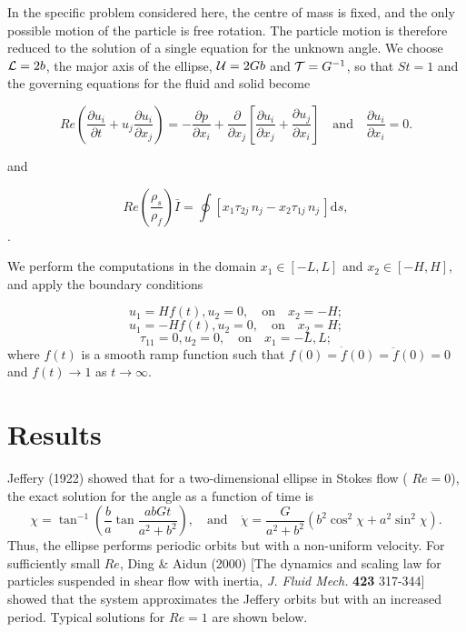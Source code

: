 In the specific problem considered here, the centre of mass is fixed, and the only possible motion of the particle is free rotation. The particle motion is therefore reduced to the solution of a single equation for the unknown angle. We choose $ {\cal L} = 2b $, the major axis of the ellipse, $ {\cal U} = 2Gb $ and $ {\cal T} = G^{-1} $, so that $ St = 1 $ and the governing equations for the fluid and solid become \begin{center} \[ Re \left (\frac{\partial u_i}{\partial t} + u_j \frac{\partial u_i}{\partial x_j} \right) = - \frac{\partial p}{\partial x_i} + \frac{\partial }{\partial x_j} \left[ \frac{\partial u_i}{\partial x_j} + \frac{\partial u_j}{\partial x_i} \right] \quad\mbox{and}\quad \frac{\partial u_i}{\partial x_i} = 0. \] \end{center}  and \begin{center} \[ Re \left(\frac{\rho_{s}}{\rho_{f}}\right) \bar{I} = \oint \left[x_{1}\tau_{2j}\,n_{j} - x_{2} \tau_{1j}\,n_{j}\, \right] \mbox{d} s, \]. \end{center} 

We perform the computations in the domain $ x_{1} \in [-L, L]$ and $ x_{2} \in [-H, H] $, and apply the boundary conditions \begin{center} \[ u_{1} = H f(t), u_{2} = 0, \quad\mbox{on}\quad x_{2} = -H; \] \[ u_{1} = -H f(t), u_{2} = 0, \quad\mbox{on}\quad x_{2} = H; \] \[ \tau_{11} = 0, u_{2} = 0, \quad\mbox{on}\quad x_{1} = -L, L; \] where $f(t)$ is a smooth ramp function such that $f(0) = \dot{f}(0) = \ddot{f}(0) = 0$ and $f(t) \to 1$ as $ t \to \infty$. \end{center} \hypertarget{index_results}{}\section{Results}\label{index_results}
Jeffery (1922) showed that for a two-\/dimensional ellipse in Stokes flow ( $ Re = 0 $), the exact solution for the angle as a function of time is \[ \chi = \tan^{-1}\left(\frac{b}{a}\tan \frac{abGt}{a^{2} + b^{2}}\right),\quad\mbox{and}\quad \dot{\chi} = \frac{G}{a^{2} + b^{2}}\left(b^{2}\cos^{2}\chi + a^{2}\sin^{2}\chi\right). \] Thus, the ellipse performs periodic orbits but with a non-\/uniform velocity. For sufficiently small $ Re $, Ding \& Aidun (2000) \mbox{[}The dynamics and scaling law for particles suspended in shear flow with inertia, {\itshape  J. Fluid Mech. } {\bfseries  423 } 317-\/344\mbox{]} showed that the system approximates the Jeffery orbits but with an increased period. Typical solutions for $ Re = 1$ are shown below.

